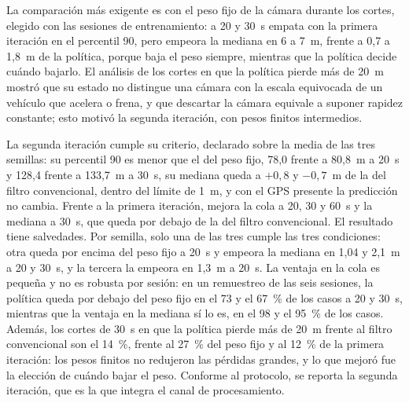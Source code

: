 La comparación más exigente es con el peso fijo de la cámara durante los cortes, elegido con las sesiones de entrenamiento: a 20 y 30~s empata con la primera iteración en el percentil 90, pero empeora la mediana en 6 a 7~m, frente a 0,7 a 1,8~m de la política, porque baja el peso siempre, mientras que la política decide cuándo bajarlo.
El análisis de los cortes en que la política pierde más de 20~m mostró que su estado no distingue una cámara con la escala equivocada de un vehículo que acelera o frena, y que descartar la cámara equivale a suponer rapidez constante; esto motivó la segunda iteración, con pesos finitos intermedios.

La segunda iteración cumple su criterio, declarado sobre la media de las tres semillas: su percentil 90 es menor que el del peso fijo, 78,0 frente a 80,8~m a 20~s y 128,4 frente a 133,7~m a 30~s, su mediana queda a $+0{,}8$ y $-0{,}7$~m de la del filtro convencional, dentro del límite de 1~m, y con el GPS presente la predicción no cambia.
Frente a la primera iteración, mejora la cola a 20, 30 y 60~s y la mediana a 30~s, que queda por debajo de la del filtro convencional.
El resultado tiene salvedades.
Por semilla, solo una de las tres cumple las tres condiciones: otra queda por encima del peso fijo a 20~s y empeora la mediana en 1,04 y 2,1~m a 20 y 30~s, y la tercera la empeora en 1,3~m a 20~s.
La ventaja en la cola es pequeña y no es robusta por sesión: en un remuestreo de las seis sesiones, la política queda por debajo del peso fijo en el 73 y el 67~\% de los casos a 20 y 30~s, mientras que la ventaja en la mediana sí lo es, en el 98 y el 95~\% de los casos.
Además, los cortes de 30~s en que la política pierde más de 20~m frente al filtro convencional son el 14~\%, frente al 27~\% del peso fijo y al 12~\% de la primera iteración: los pesos finitos no redujeron las pérdidas grandes, y lo que mejoró fue la elección de cuándo bajar el peso.
Conforme al protocolo, se reporta la segunda iteración, que es la que integra el canal de procesamiento.

